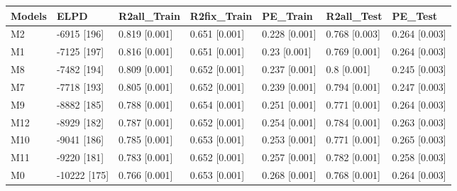 \begin{table}[ht]
\centering
\begin{tabular}{lllllll}
  \hline
Models & ELPD & R2all\_Train & R2fix\_Train & PE\_Train & R2all\_Test & PE\_Test \\ 
  \hline
M2 & -6915 [196] & 0.819 [0.001] & 0.651 [0.001] & 0.228 [0.001] & 0.768 [0.003] & 0.264 [0.003] \\ 
  M1 & -7125 [197] & 0.816 [0.001] & 0.651 [0.001] & 0.23 [0.001] & 0.769 [0.001] & 0.264 [0.003] \\ 
  M8 & -7482 [194] & 0.809 [0.001] & 0.652 [0.001] & 0.237 [0.001] & 0.8 [0.001] & 0.245 [0.003] \\ 
  M7 & -7718 [193] & 0.805 [0.001] & 0.652 [0.001] & 0.239 [0.001] & 0.794 [0.001] & 0.247 [0.003] \\ 
  M9 & -8882 [185] & 0.788 [0.001] & 0.654 [0.001] & 0.251 [0.001] & 0.771 [0.001] & 0.264 [0.003] \\ 
  M12 & -8929 [182] & 0.787 [0.001] & 0.652 [0.001] & 0.254 [0.001] & 0.784 [0.001] & 0.263 [0.003] \\ 
  M10 & -9041 [186] & 0.785 [0.001] & 0.653 [0.001] & 0.253 [0.001] & 0.771 [0.001] & 0.265 [0.003] \\ 
  M11 & -9220 [181] & 0.783 [0.001] & 0.652 [0.001] & 0.257 [0.001] & 0.782 [0.001] & 0.258 [0.003] \\ 
  M0 & -10222 [175] & 0.766 [0.001] & 0.653 [0.001] & 0.268 [0.001] & 0.768 [0.001] & 0.264 [0.003] \\ 
   \hline
\end{tabular}
\end{table}
